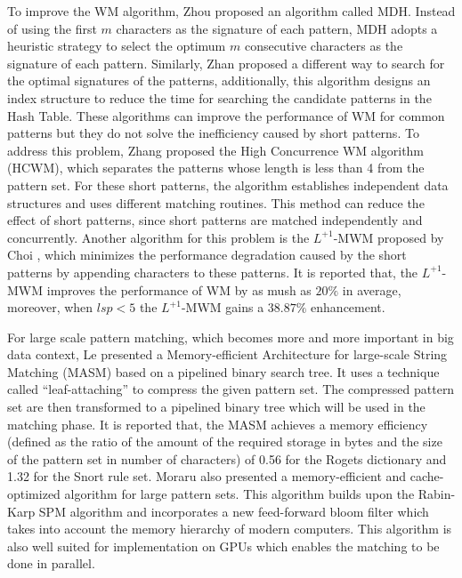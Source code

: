 To improve the \textsf{WM} algorithm, Zhou \cite{Zhou2007} proposed an
algorithm called \textsf{MDH}. Instead of using the first $m$
characters as the signature of each pattern, \textsf{MDH} adopts a
heuristic strategy to select the optimum $m$ consecutive characters as
the signature of each pattern. Similarly, Zhan \cite{Zhan2014}
proposed a different way to search for the optimal signatures of the
patterns, additionally, this algorithm designs an index structure to
reduce the time for searching the candidate patterns in the Hash
Table. These algorithms can improve the performance of \textsf{WM} for
common patterns but they do not solve the inefficiency caused by short
patterns. To address this problem, Zhang \cite{Zhang2009} proposed the
High Concurrence WM algorithm (\textsf{HCWM}), which separates the
patterns whose length is less than 4 from the pattern set. For these
short patterns, the algorithm establishes independent data structures
and uses different matching routines. This method can reduce the
effect of short patterns, since short patterns are matched
independently and concurrently. Another algorithm for this problem is
the \textsf{$L^{+1}$-MWM} proposed by Choi \cite{Choi2011}, which
minimizes the performance degradation caused by the short patterns by
appending characters to these patterns. It is reported that, the
\textsf{$L^{+1}$-MWM} improves the performance of WM by as mush as
$20\%$ in average, moreover, when $lsp < 5$ the \textsf{$L^{+1}$-MWM}
gains a $38.87\%$ enhancement.

For large scale pattern matching, which becomes more and more
important in big data context, Le \cite{Le2013} presented a
Memory-efficient Architecture for large-scale String Matching
(\textsf{MASM}) based on a pipelined binary search tree. It uses a
technique called ``leaf-attaching'' to compress the given pattern
set. The compressed pattern set are then transformed to a pipelined
binary tree which will be used in the matching phase.  It is reported
that, the \textsf{MASM} achieves a memory efficiency (defined as the
ratio of the amount of the required storage in bytes and the size of
the pattern set in number of characters) of 0.56 for the Rogets
dictionary and 1.32 for the Snort rule set. Moraru \cite{Moraru2012}
also presented a memory-efficient and cache-optimized algorithm for
large pattern sets. This algorithm builds upon the Rabin-Karp
\cite{Karp1987} SPM algorithm and incorporates a new
\textsf{feed-forward} bloom filter which takes into account the memory
hierarchy of modern computers. This algorithm is also well suited for
implementation on GPUs which enables the matching to be done in
parallel.

